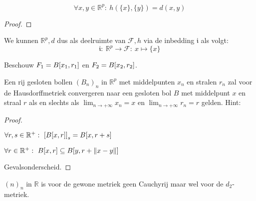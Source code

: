 \documentclass[main.tex]{subfiles}
\begin{document}
\begin{st}
  \[ \forall x,y \in \mathbb{R}^{p}:\ h(\{x\},\{y\}) = d(x,y) \]

  \begin{proof}
    
  \end{proof}
\end{st}
\begin{opm}
  We kunnen $\mathbb{R}^{p},d$ dus als deelruimte van $\mathcal{F},h$ via de inbedding $\mathfrak{i}$ als volgt:
  \[ \mathfrak{i}:\ \mathbb{R}^{p} \rightarrow \mathcal{F}:\ x \mapsto \{x\} \]
\end{opm}

\begin{vb}
  Beschouw $F_{1} = B\interval{x_{1}}{r_{1}}$ en $F_{2}= B\interval{x_{2}}{r_{2}}$.

\end{vb}


\begin{st}
  Een rij gesloten bollen $(B_{n})_{n}$ in $\mathbb{R}^{p}$ met middelpunten $x_{n}$ en stralen $r_{n}$ zal voor de Hausdorffmetriek convergeren naar een gesloten bol $B$ met middelpunt $x$ en straal $r$ als en slechts als $\lim_{n\rightarrow +\infty}x_{n}=x$ en $\lim_{n\rightarrow +\infty}r_{n} = r$ gelden.
Hint:
\begin{proof}
  \begin{lem}
    $\forall r,s \in \mathbb{R}^{+}:\ \left[B\interval{x}{r}\right]_{s} = B\interval{x}{r+s}$
  \end{lem}

  \begin{lem}
    $\forall r\in \mathbb{R}^{+}:\ B\interval{x}{r} \subseteq B\interval{y}{r+\|x-y\|}$
  \end{lem}
  Gevalsonderscheid.
\end{proof}
\end{st}

\begin{st}
  $(n)_{n}$ in $\mathbb{R}$ is voor de gewone metriek geen Cauchyrij maar wel voor de $d_{2}$-metriek.
\end{st}
\end{document}

